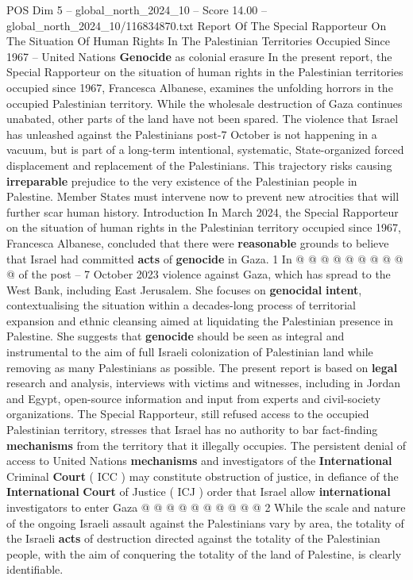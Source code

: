 \begin{textsample}{POS Dim 5 – global\_north\_2024\_10 – Score 14.00 – global\_north\_2024\_10/116834870.txt}  \label{ex:f5_pos_403}
Report Of The Special Rapporteur On The Situation Of Human Rights In The Palestinian Territories Occupied Since 1967 -- United Nations \textbf{Genocide} as colonial erasure In the present report, the Special Rapporteur on the situation of human rights in the Palestinian territories occupied since 1967, Francesca Albanese, examines the unfolding horrors in the occupied Palestinian territory.
While the wholesale destruction of Gaza continues unabated, other parts of the land have not been spared.
The violence that Israel has unleashed against the Palestinians post-7 October is not happening in a vacuum, but is part of a long-term intentional, systematic, State-organized forced displacement and replacement of the Palestinians.
This trajectory risks causing \textbf{irreparable} prejudice to the very existence of the Palestinian people in Palestine.
Member States must intervene now to prevent new atrocities that will further scar human history.
Introduction In March 2024, the Special Rapporteur on the situation of human rights in the Palestinian territory occupied since 1967, Francesca Albanese, concluded that there were \textbf{reasonable} grounds to believe that Israel had committed \textbf{acts} of \textbf{genocide} in Gaza. 1 In @ @ @ @ @ @ @ @ @ @ of the post -- 7 October 2023 violence against Gaza, which has spread to the West Bank, including East Jerusalem.
She focuses on \textbf{genocidal} \textbf{intent}, contextualising the situation within a decades-long process of territorial expansion and ethnic cleansing aimed at liquidating the Palestinian presence in Palestine.
She suggests that \textbf{genocide} should be seen as integral and instrumental to the aim of full Israeli colonization of Palestinian land while removing as many Palestinians as possible.
The present report is based on \textbf{legal} research and analysis, interviews with victims and witnesses, including in Jordan and Egypt, open-source information and input from experts and civil-society organizations.
The Special Rapporteur, still refused access to the occupied Palestinian territory, stresses that Israel has no authority to bar fact-finding \textbf{mechanisms} from the territory that it illegally occupies.
The persistent denial of access to United Nations \textbf{mechanisms} and investigators of the \textbf{International} Criminal \textbf{Court} ( ICC ) may constitute obstruction of justice, in defiance of the \textbf{International} \textbf{Court} of Justice ( ICJ ) order that Israel allow \textbf{international} investigators to enter Gaza @ @ @ @ @ @ @ @ @ @ 2 While the scale and nature of the ongoing Israeli assault against the Palestinians vary by area, the totality of the Israeli \textbf{acts} of destruction directed against the totality of the Palestinian people, with the aim of conquering the totality of the land of Palestine, is clearly identifiable.

\end{textsample}
